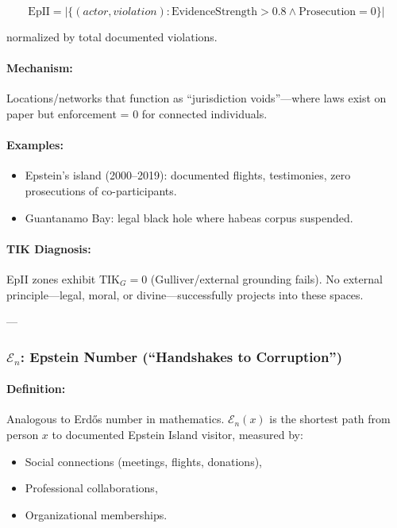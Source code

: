 \documentclass[11pt,a4paper]{article}
\theoremstyle{definition}
\theoremstyle{remark}
\begin{document}
\[
\text{EpII} = |\{(actor, violation) : \text{EvidenceStrength} > 0.8 \land \text{Prosecution} = 0\}|
\]

normalized by total documented violations.

\paragraph{Mechanism:}
Locations/networks that function as ``jurisdiction voids''—where laws exist on paper but enforcement = 0 for connected individuals.

\paragraph{Examples:}
\begin{itemize}
\item Epstein's island (2000–2019): documented flights, testimonies, zero prosecutions of co-participants.
\item Guantanamo Bay: legal black hole where habeas corpus suspended.
\end{itemize}

\paragraph{TIK Diagnosis:}
EpII zones exhibit $\text{TIK}_G = 0$ (Gulliver/external grounding fails). No external principle—legal, moral, or divine—successfully projects into these spaces.

---

\subsubsection{$\mathcal{E}_n$: Epstein Number (``Handshakes to Corruption'')}

\paragraph{Definition:}
Analogous to Erdős number in mathematics. $\mathcal{E}_n(x)$ is the shortest path from person $x$ to documented Epstein Island visitor, measured by:
\begin{itemize}
\item Social connections (meetings, flights, donations),
\item Professional collaborations,
\item Organizational memberships.
\end{itemize}
\end{document}
